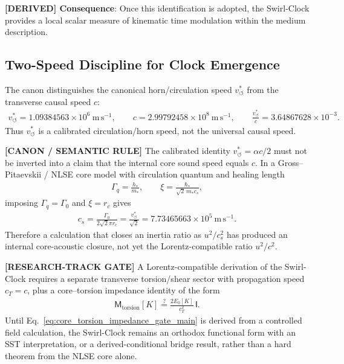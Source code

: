 \documentclass[11pt]{article}
\theoremstyle{definition}
\theoremstyle{plain}
\theoremstyle{remark}
\newcommand{\rc}{{r_c}}
\newcommand{\vchar}{v_{\!\boldsymbol{\circlearrowleft}}^{\ast}}
\begin{document}
        \textbf{[DERIVED] Consequence}: Once this identification is adopted, the Swirl-Clock provides a local scalar measure of kinematic time modulation within the medium description.

    \subsection{Two-Speed Discipline for Clock Emergence}
        \label{subsec:two_speed_clock_discipline}

        The canon distinguishes the canonical horn/circulation speed \(\vchar\) from the transverse causal speed \(c\):
        \begin{align}
            \vchar = 1.09384563\times 10^{6}\ \mathrm{m\,s^{-1}},
            \qquad
            c = 2.99792458\times 10^{8}\ \mathrm{m\,s^{-1}},
            \qquad
            \frac{\vchar}{c}=3.64867628\times10^{-3}.
        \end{align}
        Thus \(\vchar\) is a calibrated circulation/horn speed, not the universal causal speed.

        \textbf{[CANON / SEMANTIC RULE]} The calibrated identity \(\vchar=\alpha c/2\) must not be inverted into a claim that the internal core sound speed equals \(c\).  In a Gross--Pitaevskii / NLSE core model with circulation quantum and healing length
        \begin{align}
            \Gamma_q = \frac{h_*}{m_*},
            \qquad
            \xi = \frac{\hbar_*}{\sqrt{2}\,m_* c_s},
        \end{align}
        imposing \(\Gamma_q=\Gamma_0\) and \(\xi=\rc\) gives
        \begin{align}
            c_s
            =
            \frac{\Gamma_0}{2\sqrt{2}\pi\rc}
            =
            \frac{\vchar}{\sqrt{2}}
            =
            7.73465663\times10^{5}\ \mathrm{m\,s^{-1}}.
            \label{eq:core_sound_speed_vchar_over_sqrt2}
        \end{align}
        Therefore a calculation that closes an inertia ratio as \(u^2/c_s^2\) has produced an internal core-acoustic closure, not yet the Lorentz-compatible ratio \(u^2/c^2\).

        \textbf{[RESEARCH-TRACK GATE]} A Lorentz-compatible derivation of the Swirl-Clock requires a separate transverse torsion/shear sector with propagation speed \(c_T=c\), plus a core--torsion impedance identity of the form
        \begin{align}
            \mathsf M_{\mathrm{torsion}}[K]
            \stackrel{?}{=}
            \frac{2E_0[K]}{c_T^2}\,\mathsf I .
            \label{eq:core_torsion_impedance_gate_main}
        \end{align}
        Until Eq.~\eqref{eq:core_torsion_impedance_gate_main} is derived from a controlled field calculation, the Swirl-Clock remains an orthodox functional form with an SST interpretation, or a derived-conditional bridge result, rather than a hard theorem from the NLSE core alone.
\end{document}
